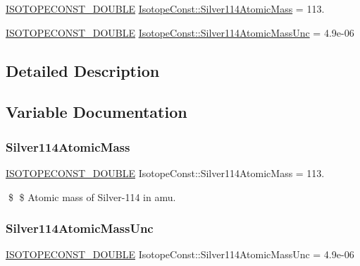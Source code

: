 \begin{DoxyCompactItemize}
\item 
\mbox{\hyperlink{group___isotope_const-_macros_ga8f45a7272ce02c0b4c65c44636ed719a}{I\+S\+O\+T\+O\+P\+E\+C\+O\+N\+S\+T\+\_\+\+D\+O\+U\+B\+LE}} \mbox{\hyperlink{group___isotope_const-_silver-_ag114_gaea3efd3f7bd6d3041a53e8f311016464}{Isotope\+Const\+::\+Silver114\+Atomic\+Mass}} = 113.
\item 
\mbox{\hyperlink{group___isotope_const-_macros_ga8f45a7272ce02c0b4c65c44636ed719a}{I\+S\+O\+T\+O\+P\+E\+C\+O\+N\+S\+T\+\_\+\+D\+O\+U\+B\+LE}} \mbox{\hyperlink{group___isotope_const-_silver-_ag114_ga6bd119fefdfa2fc43df9695210becf60}{Isotope\+Const\+::\+Silver114\+Atomic\+Mass\+Unc}} = 4.\+9e-\/06
\end{DoxyCompactItemize}


\subsection{Detailed Description}


\subsection{Variable Documentation}
\mbox{\label{group___isotope_const-_silver-_ag114_gaea3efd3f7bd6d3041a53e8f311016464}} 
\subsubsection{\texorpdfstring{Silver114\+Atomic\+Mass}{Silver114AtomicMass}}
{\footnotesize\ttfamily \mbox{\hyperlink{group___isotope_const-_macros_ga8f45a7272ce02c0b4c65c44636ed719a}{I\+S\+O\+T\+O\+P\+E\+C\+O\+N\+S\+T\+\_\+\+D\+O\+U\+B\+LE}} Isotope\+Const\+::\+Silver114\+Atomic\+Mass = 113.}

\$ \$ Atomic mass of Silver-\/114 in amu. \mbox{\label{group___isotope_const-_silver-_ag114_ga6bd119fefdfa2fc43df9695210becf60}} 
\subsubsection{\texorpdfstring{Silver114\+Atomic\+Mass\+Unc}{Silver114AtomicMassUnc}}
{\footnotesize\ttfamily \mbox{\hyperlink{group___isotope_const-_macros_ga8f45a7272ce02c0b4c65c44636ed719a}{I\+S\+O\+T\+O\+P\+E\+C\+O\+N\+S\+T\+\_\+\+D\+O\+U\+B\+LE}} Isotope\+Const\+::\+Silver114\+Atomic\+Mass\+Unc = 4.\+9e-\/06}

